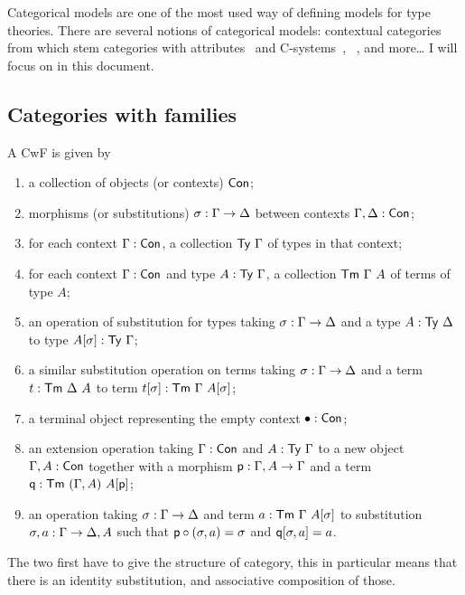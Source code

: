 Categorical models are one of the most used way of defining models for type
theories. There are several notions of categorical models:
contextual categories~ from which stem
categories with attributes~ and
C-systems~,
~, and more\dots
I will focus on  in this document.

\subsection{Categories with families}

A \acrshort{CwF} is given by
\begin{enumerate}
  \item a collection of objects (or contexts) \(\mathsf{Con}\);
  \item morphisms (or substitutions) \(\sigma : \Gamma \to \Delta\) between contexts
  \(\Gamma, \Delta : \mathsf{Con}\);
  \item for each context \(\Gamma : \mathsf{Con}\), a collection \(\mathsf{Ty}\ \Gamma\) of types in
  that context;
  \item for each context \(\Gamma : \mathsf{Con}\) and type \(A : \mathsf{Ty}\ \Gamma\), a collection
  \(\mathsf{Tm}\ \Gamma\ A\) of terms of type \(A\);
  \item an operation of substitution for types taking \(\sigma : \Gamma \to \Delta\)
  and a type \(A : \mathsf{Ty}\ \Delta\) to type \(A[\sigma] : \mathsf{Ty}\ \Gamma\);
  \item \label{item:term-subst} a similar substitution operation on terms taking
  \(\sigma : \Gamma \to \Delta\) and a term \(t : \mathsf{Tm}\ \Delta\ A\) to term
  \(t[\sigma] : \mathsf{Tm}\ \Gamma\ A[\sigma]\);
  \item a terminal object representing the empty context \(\bullet : \mathsf{Con}\);
  \item an extension operation taking \(\Gamma : \mathsf{Con}\) and \(A : \mathsf{Ty}\ \Gamma\)
  to a new object \(\Gamma, A : \mathsf{Con}\) together with a morphism
  \(\mathsf{p} : \Gamma, A \to \Gamma\) and a term \(\pq : \CTm\ (\Ga, A)\ A[\pp]\);
  \item an operation taking \(\sigma : \Gamma \to \Delta\) and term
  \(a : \CTm\ \Ga\ A[\sigma]\) to substitution \(\sigma, a : \Gamma \to \Delta, A\)
  such that \(\mathsf{p} \circ (\sigma, a) = \sigma\) and \(\mathsf{q}[\sigma, a] = a\).
\end{enumerate}
The two first have to give the structure of category, this in particular means
that there is an identity substitution, and associative composition of those.

